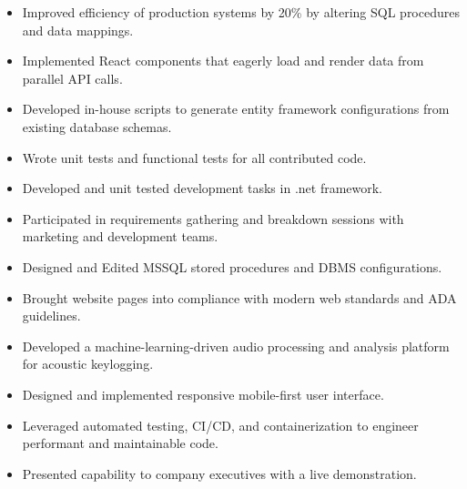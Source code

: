 \documentclass[10pt,a4paper,ragged2e,withhyper]{altacv}
\begin{document}
\medskip
\medskip
\medskip
\medskip
\medskip



\smallskip
{}

\begin{itemize}
\item Improved efficiency of production systems by 20\% by altering SQL procedures and data mappings.
\item Implemented React components that eagerly load and render data from parallel API calls.
\item Developed in-house scripts to generate entity framework configurations from existing database schemas.
\item Wrote unit tests and functional tests for all contributed code.
\end{itemize}

\divider{}

\begin{itemize}
\item Developed and unit tested development tasks in .net framework.
\item Participated in requirements gathering and breakdown sessions with marketing and development teams.
\item Designed and Edited MSSQL stored procedures and DBMS configurations.
\item Brought website pages into compliance with modern web standards and ADA guidelines.
\end{itemize}

\divider{}

\begin{itemize}
\item Developed a machine-learning-driven audio processing and analysis platform for acoustic keylogging.
\item Designed and implemented responsive mobile-first user interface.
\item Leveraged automated testing, CI/CD, and containerization to engineer performant and maintainable code.
\item Presented capability to company executives with a live demonstration.
\end{itemize}
\end{document}
